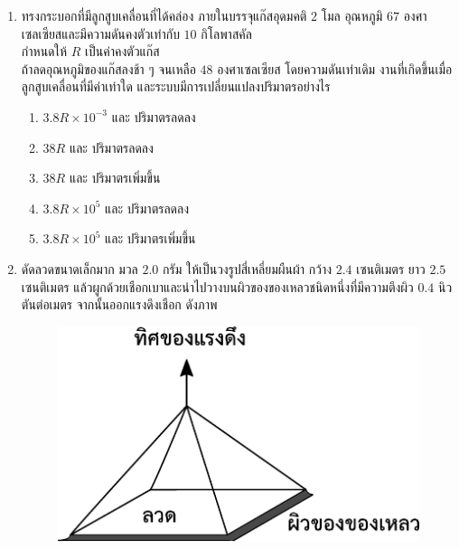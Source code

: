 \documentclass[a4paper, 12pt]{article}
\begin{document}
\begin{enumerate}
\begin{figure}[H]
          \end{figure}
          หากต้องการลวดโลหะที่ทนต่อแรงภายนอกที่มากระทำได้มากกว่า โดยยังสามารถกลับมามีความยาวเท่าเดิมควรเลือกลวดโลหะใด และมอดุลัสของยังของลวดโลหะดังกล่าวมีค่ากี่พาสคัล
          \begin{enumerate}
              \item ลวดโลหะ A และ \num{2.0e-11} พาสคัล
              \item ลวดโลหะ A และ \num{5.0e10} พาสคัล
              \item ลวดโลหะ B และ \num{5.0e-12} พาสคัล
              \item ลวดโลหะ B และ \num{8.0e8} พาสคัล
              \item ลวดโลหะ B และ \num{2.0e11} พาสคัล
          \end{enumerate}
          \newpage
    \item ทรงกระบอกที่มีลูกสูบเคลื่อนที่ได้คล่อง ภายในบรรจุแก๊สอุดมคติ \(2\) โมล อุณหภูมิ \(67\) องศาเซลเซียสและมีความดันคงตัวเท่ากับ \(10\) กิโลพาสคัล \\
          กำหนดให้ \(R\) เป็นค่าคงตัวแก๊ส \\
          ถ้าลดอุณหภูมิของแก๊สลงช้า ๆ จนเหลือ \(48\) องศาเซลเซียส โดยความดันเท่าเดิม งานที่เกิดขึ้นเมื่อลูกสูบเคลื่อนที่มีค่าเท่าใด และระบบมีการเปลี่ยนแปลงปริมาตรอย่างไร
          \begin{enumerate}
              \item \(3.8R\times10^{-3}\) และ ปริมาตรลดลง
              \item \(38R\) และ ปริมาตรลดลง
              \item \(38R\) และ ปริมาตรเพิ่มขึ้น
              \item \(3.8R\times10^5\) และ ปริมาตรลดลง
              \item \(3.8R\times10^5\) และ ปริมาตรเพิ่มขึ้น
          \end{enumerate}
          \newpage
    \item ดัดลวดขนาดเล็กมาก มวล \(2.0\) กรัม ให้เป็นวงรูปสี่เหลี่ยมผืนผ้า กว้าง \(2.4\) เซนติเมตร ยาว \(2.5\) เซนติเมตร แล้วผูกด้วยเชือกเบาและนำไปวางบนผิวของของเหลวชนิดหนึ่งที่มีความตึงผิว \(0.4\) นิวตันต่อเมตร จากนั้นออกแรงดึงเชือก ดังภาพ \\
          \begin{figure}[H]
              \centering
              \includegraphics{images/15_16.pdf}

\end{figure}
\end{enumerate}
\end{document}
